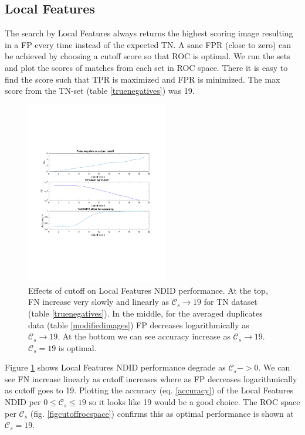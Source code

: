 \documentclass[english,12pt,a4paper,pdftex,elec,utf8]{aaltothesis}
\begin{document}
\subsection{Local Features}
The search by Local Features always returns the highest scoring image resulting in a FP every time instead of the expected TN. A sane FPR (close to zero) can be achieved by choosing a cutoff score so that ROC is optimal. We run the sets and plot the scores of matches from each set in ROC space. There it is easy to find the score such that TPR is maximized and FPR is minimized. The max score from the TN-set (table \ref{truenegatives}) was 19.

\begin{figure}[htb]
\begin{center}
\includegraphics[height=8cm]{figures/SIFTCountROC}
\end{center}
\caption{ Effects of cutoff on Local Features NDID performance. At the top, FN increase very slowly and linearly as $\mathcal{C}_s \rightarrow 19$ for TN dataset (table \ref{truenegatives}). In the middle, for the averaged duplicates data (table \ref{modifiedimages}) FP decreases logarithmically as $\mathcal{C}_s \rightarrow 19$. At the bottom we can see accuracy increase as $\mathcal{C}_s \rightarrow 19$. $\mathcal{C}_s=19$ is optimal.}
\label{figcutoff}
\end{figure}

Figure \ref{figcutoff} shows Local Features NDID performance degrade as $\mathcal{C}_{s}->0$. We can see FN increase linearly as cutoff increases where as FP decreases logarithmically as cutoff goes to 19. Plotting the accuracy (eq. \ref{accuracy}) of the Local Features NDID per $0 \leq \mathcal{C}_{s} \leq 19$ so it looks like 19 would be a good choice. The ROC space per $\mathcal{C}_s$ (fig. \ref{figcutoffrocspace}) confirms this as optimal performance is shown at $\mathcal{C}_s=19$.
\end{document}
